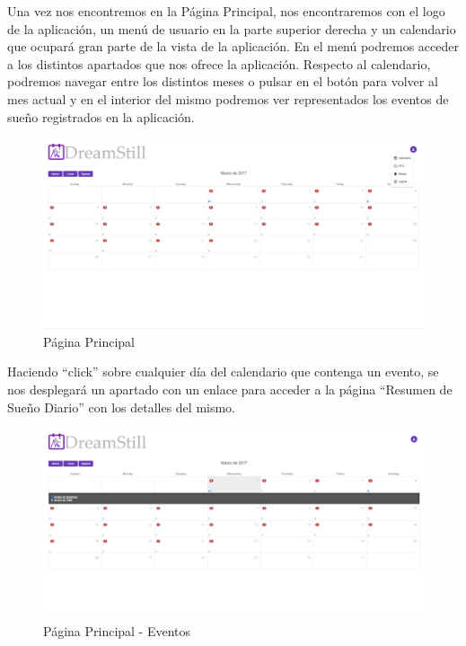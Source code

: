 \documentclass[11pt,openany]{book}
\begin{document}
Una vez nos encontremos en la Página Principal, nos encontraremos con el logo de la aplicación, un menú de usuario en la parte superior derecha y un calendario que ocupará gran parte de la vista de la aplicación. En el menú podremos acceder a los distintos apartados que nos ofrece la aplicación. Respecto al calendario, podremos navegar entre los distintos meses o pulsar en el botón para volver al mes actual y en el interior del mismo podremos ver representados los eventos de sueño registrados en la aplicación. 

\begin{figure}[H]
\centering
\includegraphics[totalheight=7cm]{manualUsuario/paginaPrincipal.png}
\caption{Página Principal}
\end{figure}

Haciendo ``click'' sobre cualquier día del calendario que contenga un evento, se nos desplegará un apartado con un enlace para acceder a la página ``Resumen de Sueño Diario'' con los detalles del mismo.

\begin{figure}[H]
\centering
\includegraphics[totalheight=7cm]{manualUsuario/eventos.png}
\caption{Página Principal - Eventos}
\end{figure}
\end{document}
